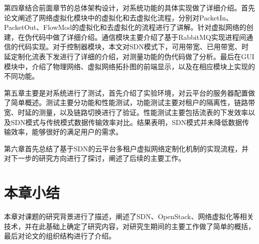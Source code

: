 第四章结合前面章节的总体架构设计，对系统功能的具体实现做了详细介绍。首先论文阐述了网络虚拟化模块中的虚拟化和去虚拟化流程，分别对PacketIn、PacketOut、FlowMod的虚拟化和去虚拟化的流程进行了讲解。针对虚拟网络的创建，在伪代码中做了详细介绍。通信模块主要介绍了基于RabbitMQ实现进程间通信的代码实现。对于控制器模块，本文对SDN模式下，可用带宽、已用带宽、时延定制化流表下发进行了详细的介绍，对测量功能的伪代码做了分析。最后在GUI模块中，介绍了物理网络、虚拟网络拓扑图的前端显示，以及在相应模块上实现的不同功能。

第五章主要是对系统进行了测试，首先介绍了实验环境，对云平台的服务器配置做了简单概述。测试主要分功能和性能测试，功能测试主要对租户的隔离性，链路带宽、时延的测量，以及链路切换进行了验证。性能测试主要包括流表的下发效率以及SDN模式与传统模式数据传输效率对比。结果表明，SDN模式并未降低数据传输效率，能够很好的满足用户的需求。

第六章首先总结了基于SDN的云平台多租户虚拟网络定制化机制的实现流程，并对下一步的研究方向进行了探讨，阐述了后续的主要工作。

\section{本章小结}
本章对课题的研究背景进行了描述，阐述了SDN、OpenStack、网络虚拟化等相关技术，并在此基础上确定了研究内容，对研究生期间的主要工作做了简单的概括，最后对论文的组织结构进行了介绍。
